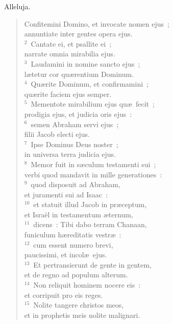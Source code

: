 \bchapter
\lettrine[lines=3,image=true,loversize=0.05,lraise=-0.03]{A}{}lleluja. \begin{flushleft}\begin{verse}\vspace{6pt}Confitemini Domino, et invocate nomen ejus~;\\ annuntiate inter gentes opera ejus.\\
${}^{2}$~Cantate ei, et psallite ei~;\\ narrate omnia mirabilia ejus.\\
${}^{3}$~Laudamini in nomine sancto ejus~;\\ l\ae tetur cor qu\ae rentium Dominum.\\
${}^{4}$~Qu\ae rite Dominum, et confirmamini~;\\ qu\ae rite faciem ejus semper.\\
${}^{5}$~Mementote mirabilium ejus qu\ae\ fecit~;\\ prodigia ejus, et judicia oris ejus~:\\
${}^{6}$~semen Abraham servi ejus~;\\ filii Jacob electi ejus.\\
${}^{7}$~Ipse Dominus Deus noster~;\\ in universa terra judicia ejus.\\
${}^{8}$~Memor fuit in s\ae culum testamenti sui~;\\ verbi quod mandavit in mille generationes~:\\
${}^{9}$~quod disposuit ad Abraham,\\ et juramenti sui ad Isaac~:\\
${}^{10}$~et statuit illud Jacob in pr\ae ceptum,\\ et Isra\"el in testamentum \ae ternum,\\
${}^{11}$~dicens~: Tibi dabo terram Chanaan,\\ funiculum h\ae reditatis vestr\ae~:\\
${}^{12}$~cum essent numero brevi,\\ paucissimi, et incol\ae\ ejus.\\
${}^{13}$~Et pertransierunt de gente in gentem,\\ et de regno ad populum alterum.\\
${}^{14}$~Non reliquit hominem nocere eis~:\\ et corripuit pro eis reges.\\
${}^{15}$~Nolite tangere christos meos,\\ et in prophetis meis nolite malignari.\\

\end{verse}
\end{flushleft}
